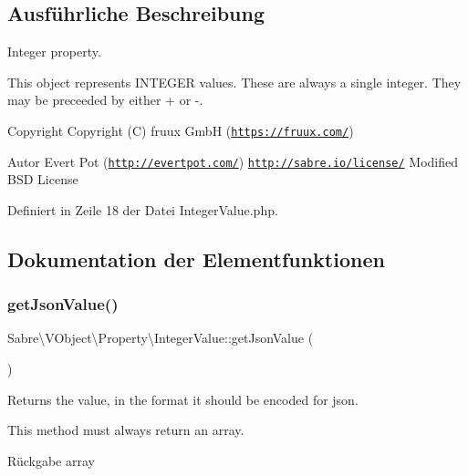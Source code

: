\subsection{Ausführliche Beschreibung}
Integer property.

This object represents I\+N\+T\+E\+G\+ER values. These are always a single integer. They may be preceeded by either + or -\/.

\begin{DoxyCopyright}{Copyright}
Copyright (C) fruux GmbH (\href{https://fruux.com/}{\tt https\+://fruux.\+com/}) 
\end{DoxyCopyright}
\begin{DoxyAuthor}{Autor}
Evert Pot (\href{http://evertpot.com/}{\tt http\+://evertpot.\+com/})  \href{http://sabre.io/license/}{\tt http\+://sabre.\+io/license/} Modified B\+SD License 
\end{DoxyAuthor}


Definiert in Zeile 18 der Datei Integer\+Value.\+php.



\subsection{Dokumentation der Elementfunktionen}
\mbox{\label{class_sabre_1_1_v_object_1_1_property_1_1_integer_value_a11a1ace366d20bd9c75d89603bd90a3a}} 
\subsubsection{\texorpdfstring{get\+Json\+Value()}{getJsonValue()}}
{\footnotesize\ttfamily Sabre\textbackslash{}\+V\+Object\textbackslash{}\+Property\textbackslash{}\+Integer\+Value\+::get\+Json\+Value (\begin{DoxyParamCaption}{ }\end{DoxyParamCaption})}

Returns the value, in the format it should be encoded for json.

This method must always return an array.

\begin{DoxyReturn}{Rückgabe}
array 
\end{DoxyReturn}


